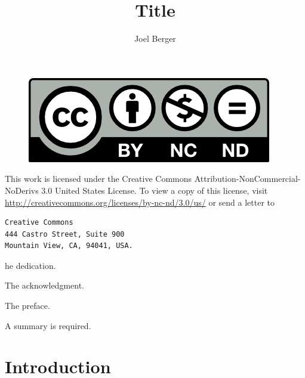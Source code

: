 \documentclass{uicthesi}
\title{Title}
\author{Joel Berger}
\begin{document}
\maketitle

\newpage
\begin{figure}
  \centering
  \includegraphics{by-nc-nd}
\end{figure}
This work is licensed under the Creative Commons Attribution-NonCommercial-NoDerivs 3.0 United States License.
To view a copy of this license, visit \url{http://creativecommons.org/licenses/by-nc-nd/3.0/us/} or send a letter to
\begin{verbatim}
Creative Commons
444 Castro Street, Suite 900
Mountain View, CA, 94041, USA.
\end{verbatim}


\dedication
The dedication.
 
\acknowledgment
The acknowledgment.
 
\preface
The preface.
 
\tableofcontents
\listoftables
\listoffigures
 
\listofabbreviations
 
\summary
A summary is required.
 
\chapter{Introduction}

 
%
%
\end{document}

